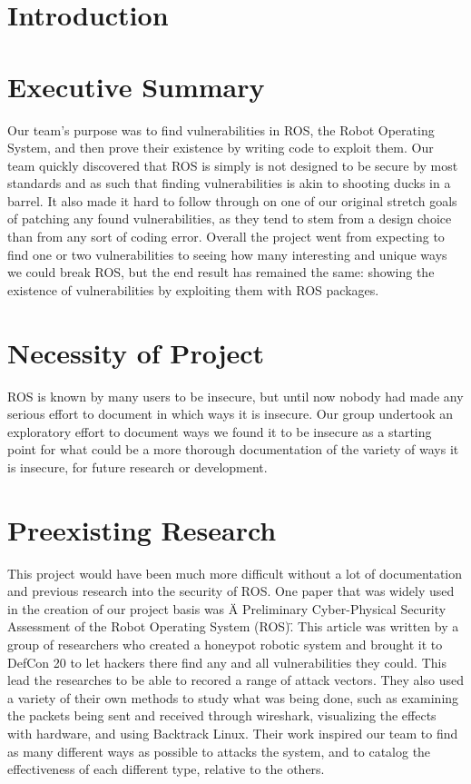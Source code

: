 \documentclass[IEEEtran,letterpaper,10pt,notitlepage,draftclsnofoot,onecolumn]{article}
\begin{document}
\newpage
{}
\tableofcontents
\clearpage

\section{Introduction}


\section{Executive Summary}
Our team’s purpose was to find vulnerabilities in ROS, the Robot Operating System, and then prove their existence by writing code to exploit them. 
Our team quickly discovered that ROS is simply is not designed to be secure by most standards and as such that finding vulnerabilities is akin to shooting ducks in a barrel. 
It also made it hard to follow through on one of our original stretch goals of patching any found vulnerabilities, as they tend to stem from a design choice than from any sort of coding error. 
Overall the project went from expecting to find one or two vulnerabilities to seeing how many interesting and unique ways we could break ROS, but the end result has remained the same: showing the existence of vulnerabilities by exploiting them with ROS packages.


\section{Necessity of Project}
ROS is known by many users to be insecure, but until now nobody had made any serious effort to document in which ways it is insecure. 
Our group undertook an exploratory effort to document ways we found it to be insecure as a starting point for what could be a more thorough documentation of the variety of ways it is insecure, for future research or development. 

\section{Preexisting Research}
This project would have been much more difficult without a lot of documentation and previous research into the security of ROS.
One paper that was widely used in the creation of our project basis was \"A Preliminary Cyber-Physical Security Assessment of the Robot
Operating System (ROS)\". \cite{mainROS}
This article was written by a group of researchers who created a honeypot robotic system and brought it to DefCon 20 to let hackers there find any and all vulnerabilities they could.
This lead the researches to be able to recored a range of attack vectors.
They also used a variety of their own methods to study what was being done, such as examining the packets being sent and received through wireshark, visualizing the effects with hardware, and using Backtrack Linux.
Their work inspired our team to find as many different ways as possible to attacks the system, and to catalog the effectiveness of each different type, relative to the others.
\end{document}
